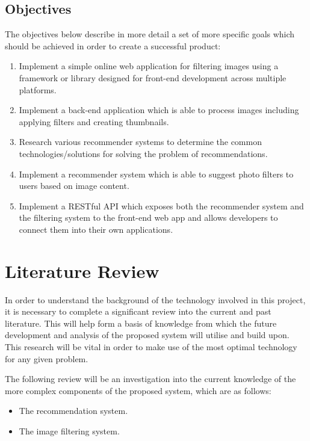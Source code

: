 \documentclass[a4paper,12pt]{report}
\begin{document}
  \newpage

  \section{Objectives} \label{sec:objectives}
    The objectives below describe in more detail a set of more specific goals which should be achieved in order to create a successful product:

    \begin{enumerate}
      \item \label{obj1}Implement a simple online web application for filtering images using a framework or library designed for front-end development across multiple platforms.
      \item \label{obj2}Implement a back-end application which is able to process images including applying filters and creating thumbnails.
      \item \label{obj3}Research various recommender systems to determine the common technologies/solutions for solving the problem of recommendations.
      \item \label{obj4}Implement a recommender system which is able to suggest photo filters to users based on image content.
      \item \label{obj5}Implement a RESTful API which exposes both the recommender system and the filtering system to the front-end web app and allows developers to connect them into their own applications.
    \end{enumerate}

\chapter{Literature Review}
  In order to understand the background of the technology involved in this project, it is necessary to complete a significant review into the current and past literature. This will help form a basis of knowledge from which the future development and analysis of the proposed system will utilise and build upon. This research will be vital in order to make use of the most optimal technology for any given problem.

  The following review will be an investigation into the current knowledge of the more complex components of the proposed system, which are as follows:

  \begin{itemize}
    \item The recommendation system.
    \item The image filtering system.
  \end{itemize}
\end{document}
